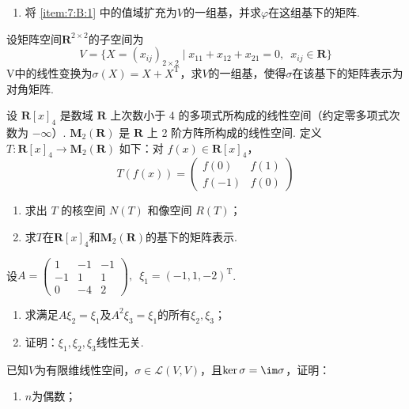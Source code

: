 \begin{exercise}
\begin{exgroup}[2]
\begin{enumerate}
            \item 将 \ref*{item:7:B:1} 中的值域扩充为$V$的一组基，并求$\varphi$在这组基下的矩阵.
        \end{enumerate}

        \item 设矩阵空间$\mathbf{R}^{2\times 2}$的子空间为
        \[V=\{X=(x_{ij})_{2\times 2} \mid x_{11}+x_{12}+x_{21}=0,\enspace x_{ij}\in \mathbf{R}\}\]
        V中的线性变换为$\sigma(X)=X+X^\mathrm{T}$，求$V$的一组基，使得$\sigma$在该基下的矩阵表示为对角矩阵.

        \item 设 $\mathbf{R}[x]_4$ 是数域 $\mathbf{R}$ 上次数小于 4 的多项式所构成的线性空间（约定零多项式次数为 $-\infty$）. $\mathbf{M}_2(\mathbf{R})$ 是 $\mathbf{R}$ 上 2 阶方阵所构成的线性空间. 定义 $T \colon \mathbf{R}[x]_4 \to \mathbf{M}_2(\mathbf{R})$ 如下：对 $f(x) \in \mathbf{R}[x]_4$，
        \[T(f(x))=\begin{pmatrix}f(0) & f(1) \\ f(-1) & f(0)\end{pmatrix}\]
        \begin{enumerate}
            \item 求出 $T$ 的核空间 $N(T)$ 和像空间 $R(T)$；

            \item 求$T$在$\mathbf{R}[x]_4$和$\mathbf{M}_2(\mathbf{R})$的基下的矩阵表示.
        \end{enumerate}

        \item 设$A=\begin{pmatrix}
                1 & -1 & -1 \\ -1 & 1 & 1 \\ 0 & -4 & 2
            \end{pmatrix},\enspace\xi_1=(-1,1,-2)^\mathrm{T}$.
        \begin{enumerate}
            \item 求满足$A\xi_2=\xi_1$及$A^2\xi_3=\xi_1$的所有$\xi_2,\xi_3$；

            \item 证明：$\xi_1,\xi_2,\xi_3$线性无关.
        \end{enumerate}

        \item 已知$V$为有限维线性空间，$\sigma\in \mathcal{L}(V,V)$，且$\ker\sigma=\im \sigma$，证明：
        \begin{enumerate}
            \item $n$为偶数；


\end{enumerate}
\end{exgroup}
\end{exercise}
